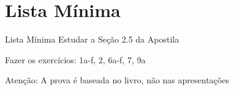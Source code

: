 \documentclass[fleqn,utf8,aspectratio=169,12pt]{beamer}
\begin{document}
\section{Lista Mínima}

\begin{frame}{Lista Mínima}
  Estudar a Seção 2.5 da Apostila

  Fazer os exercícios: 1a-f, 2, 6a-f, 7, 9a

  \vfill
  Atenção: A prova é baseada no livro, não nas apresentações
\end{frame}

\end{document}

